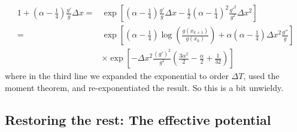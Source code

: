 \begin{align}
1 + \left(\alpha-\frac{1}{4}\right)\frac{g'}{g}\Delta x  =& \exp\left[\left(\alpha - \frac{1}{4}\right)\frac{g'}{g}\Delta x-\frac{1}{2}\left(\alpha-\frac{1}{4}\right)^2\frac{g'^2}{g^2}\Delta x^2\right]\\
 =& \exp\left[\left(\alpha - \frac{1}{4}\right)\log\left(\frac{g(x_{k+1})}{g(x_k)}\right)  +\alpha\left(\alpha - \frac{1}{4}\right)\Delta x^2\frac{g''}{g}\right]\nonumber\\
&\times\exp\left[-\Delta x^2\frac{(g')^2}{g^2}\left(\frac{3\alpha^2}{2} -\frac{\alpha}{2}+\frac{1}{32}\right)\right]
\end{align}
where in the third line we expanded the exponential to order $\Delta T$, used the moment theorem, and re-exponentiated the result.  So this is a bit unwieldy. 

\subsection{Restoring the rest: The effective potential}

